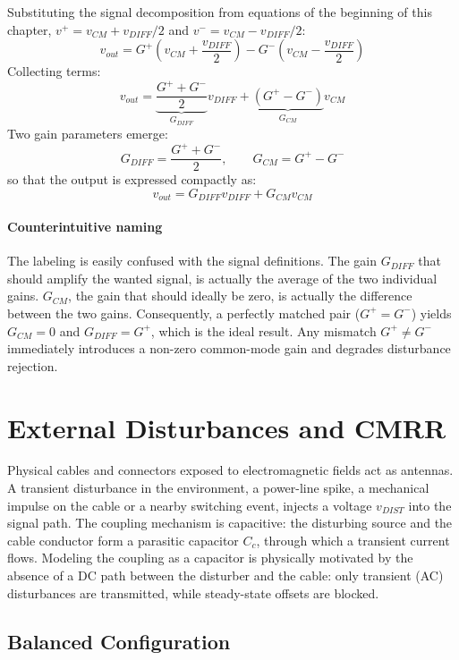 Substituting the signal decomposition from equations of the beginning of this chapter, \( v^{+} = v_{CM} + v_{DIFF}/2 \) and \( v^{-} = v_{CM} - v_{DIFF}/2 \):
\[
v_{out} = G^{+}\left(v_{CM} + \frac{v_{DIFF}}{2}\right)
        - G^{-}\left(v_{CM} - \frac{v_{DIFF}}{2}\right)
\]
Collecting terms:
\[
v_{out} = \underbrace{\frac{G^{+} + G^{-}}{2}}_{G_{DIFF}} v_{DIFF}
        + \underbrace{\left(G^{+} - G^{-}\right)}_{G_{CM}} v_{CM}
\]
Two gain parameters emerge:
\[
G_{DIFF} = \frac{G^{+} + G^{-}}{2},
\qquad
G_{CM} = G^{+} - G^{-}
\]
so that the output is expressed compactly as:
\[
v_{out} = G_{DIFF}  v_{DIFF} + G_{CM}  v_{CM}
\]

\paragraph{Counterintuitive naming} The labeling is easily confused with the signal definitions. The gain \( G_{DIFF} \) that should amplify the wanted signal, is actually the average of the two individual gains. \( G_{CM} \), the gain that should ideally be zero, is actually the difference between the two gains. Consequently, a perfectly matched pair (\( G^{+} = G^{-} \)) yields \( G_{CM} = 0 \) and \( G_{DIFF} = G^{+} \), which is the ideal result. Any mismatch \( G^{+} \neq G^{-} \) immediately introduces a non-zero common-mode gain and degrades disturbance rejection.

\section{External Disturbances and CMRR}

Physical cables and connectors exposed to electromagnetic fields act as antennas. A transient disturbance in the environment, a power-line spike, a mechanical impulse on the cable or a nearby switching event, injects a voltage \( v_{DIST} \) into the signal path. The coupling mechanism is capacitive: the disturbing source and the cable conductor form a parasitic capacitor \( C_c \), through which a transient current flows. Modeling the coupling as a capacitor is physically motivated by the absence of a DC path between the disturber and the cable: only transient (AC) disturbances are transmitted, while steady-state offsets are blocked.

\subsection{Balanced Configuration}

